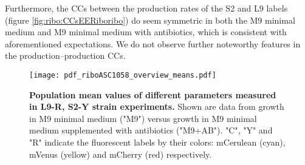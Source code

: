 Furthermore, the CCs between the production rates of the S2 and L9 labels (figure \ref{fig:ribo:CCsEERiboribo}) do seem symmetric in both the M9 minimal medium and M9 minimal medium with antibiotics, which is consistent with aforementioned expectations.
We do not observe further noteworthy features in the production--production CCs.




\begin{figure}
    \centering
    \texttt{[image: pdf\_riboASC1058\_overview\_means.pdf]}
    \caption{ 
        \textbf{Population mean values of different parameters measured in L9-R, S2-Y strain experiments.}
        Shown are data from growth in M9 minimal medium ("M9") versus growth in M9 minimal medium supplemented with antibiotics ("M9+AB").
        "C", "Y" and "R" indicate the fluorescent labels by their colors: mCerulean (cyan), mVenus (yellow) and mCherry (red) respectively.
    }
    \label{fig:ribo:meansRR}
\end{figure}


